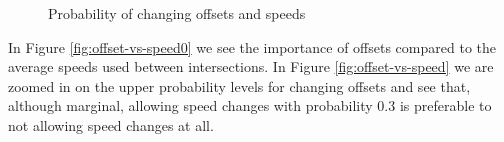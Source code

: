 \begin{figure}[htbp]
\centering
{}
\caption{Probability of changing offsets and speeds}
\end{figure}

In Figure \ref{fig:offset-vs-speed0} we see the importance of offsets compared to the average speeds used between intersections. In Figure \ref{fig:offset-vs-speed} we are zoomed in on the upper probability levels for changing offsets and see that, although marginal, allowing speed changes with probability $0.3$ is preferable to not allowing speed changes at all.